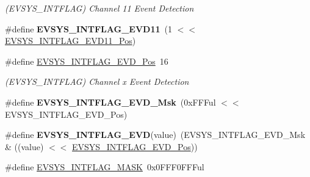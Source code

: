 \begin{DoxyCompactItemize}
\begin{DoxyCompactList}\small\item\em (E\+V\+S\+Y\+S\+\_\+\+I\+N\+T\+F\+L\+A\+G) Channel 11 Event Detection \end{DoxyCompactList}\item 
\hypertarget{group___s_a_m_l21___e_v_s_y_s_ga384b4667e76be9b24d9e49d4668aecb3}{}\#define {\bfseries E\+V\+S\+Y\+S\+\_\+\+I\+N\+T\+F\+L\+A\+G\+\_\+\+E\+V\+D11}~(1 $<$$<$ \hyperlink{group___s_a_m_l21___e_v_s_y_s_gae2501d03b71c840f1f375f748a4f2336}{E\+V\+S\+Y\+S\+\_\+\+I\+N\+T\+F\+L\+A\+G\+\_\+\+E\+V\+D11\+\_\+\+Pos})\label{group___s_a_m_l21___e_v_s_y_s_ga384b4667e76be9b24d9e49d4668aecb3}

\item 
\hypertarget{group___s_a_m_l21___e_v_s_y_s_gae8a2e87ffe71f1959939d93c6a876295}{}\#define \hyperlink{group___s_a_m_l21___e_v_s_y_s_gae8a2e87ffe71f1959939d93c6a876295}{E\+V\+S\+Y\+S\+\_\+\+I\+N\+T\+F\+L\+A\+G\+\_\+\+E\+V\+D\+\_\+\+Pos}~16\label{group___s_a_m_l21___e_v_s_y_s_gae8a2e87ffe71f1959939d93c6a876295}

\begin{DoxyCompactList}\small\item\em (E\+V\+S\+Y\+S\+\_\+\+I\+N\+T\+F\+L\+A\+G) Channel x Event Detection \end{DoxyCompactList}\item 
\hypertarget{group___s_a_m_l21___e_v_s_y_s_ga0ad36606c2ebef2555d4c1a637e66d19}{}\#define {\bfseries E\+V\+S\+Y\+S\+\_\+\+I\+N\+T\+F\+L\+A\+G\+\_\+\+E\+V\+D\+\_\+\+Msk}~(0x\+F\+F\+Ful $<$$<$ E\+V\+S\+Y\+S\+\_\+\+I\+N\+T\+F\+L\+A\+G\+\_\+\+E\+V\+D\+\_\+\+Pos)\label{group___s_a_m_l21___e_v_s_y_s_ga0ad36606c2ebef2555d4c1a637e66d19}

\item 
\hypertarget{group___s_a_m_l21___e_v_s_y_s_ga10f6afa1e4c633ed9308589e272d24e0}{}\#define {\bfseries E\+V\+S\+Y\+S\+\_\+\+I\+N\+T\+F\+L\+A\+G\+\_\+\+E\+V\+D}(value)~(E\+V\+S\+Y\+S\+\_\+\+I\+N\+T\+F\+L\+A\+G\+\_\+\+E\+V\+D\+\_\+\+Msk \& ((value) $<$$<$ \hyperlink{group___s_a_m_l21___e_v_s_y_s_gae8a2e87ffe71f1959939d93c6a876295}{E\+V\+S\+Y\+S\+\_\+\+I\+N\+T\+F\+L\+A\+G\+\_\+\+E\+V\+D\+\_\+\+Pos}))\label{group___s_a_m_l21___e_v_s_y_s_ga10f6afa1e4c633ed9308589e272d24e0}

\item 
\hypertarget{group___s_a_m_l21___e_v_s_y_s_ga817c0835938b74b56a77b1d8fd230007}{}\#define \hyperlink{group___s_a_m_l21___e_v_s_y_s_ga817c0835938b74b56a77b1d8fd230007}{E\+V\+S\+Y\+S\+\_\+\+I\+N\+T\+F\+L\+A\+G\+\_\+\+M\+A\+S\+K}~0x0\+F\+F\+F0\+F\+F\+Ful\label{group___s_a_m_l21___e_v_s_y_s_ga817c0835938b74b56a77b1d8fd230007}


\end{DoxyCompactItemize}
